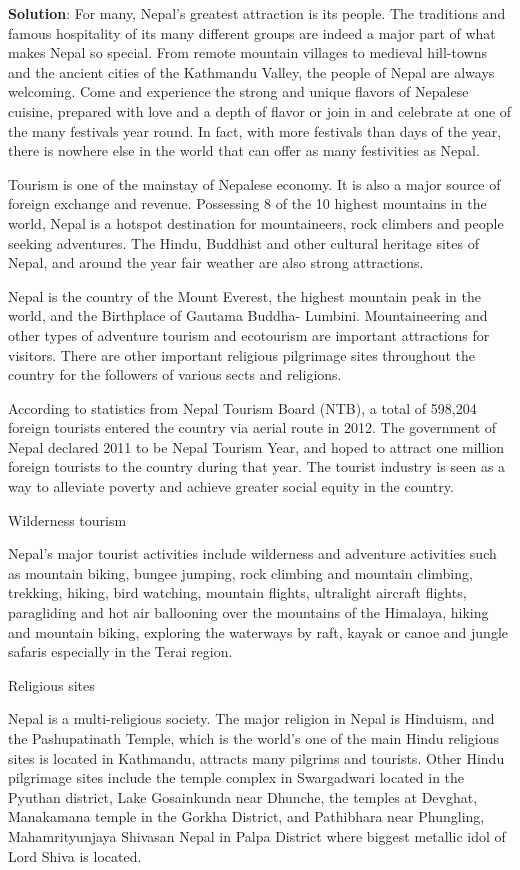 \documentclass[
  openany]{book}
\newenvironment{solution}{ {\bfseries Solution}:}{}
\begin{document}
\begin{questions}
\begin{solution}
For many, Nepal’s greatest attraction is its people. The traditions and famous hospitality of its many different groups are indeed a major part of what makes Nepal so special. From remote mountain villages to medieval hill-towns and the ancient cities of the Kathmandu Valley, the people of Nepal are always welcoming. Come and experience the strong and unique flavors of Nepalese cuisine, prepared with love and a depth of flavor or join in and celebrate at one of the many festivals year round. In fact, with more festivals than days of the year, there is nowhere else in the world that can offer as many festivities as Nepal.

Tourism is one of the mainstay of Nepalese economy. It is also a major source of foreign exchange and revenue. Possessing 8 of the 10 highest mountains in the world, Nepal is a hotspot destination for mountaineers, rock climbers and people seeking adventures. The Hindu, Buddhist and other cultural heritage sites of Nepal, and around the year fair weather are also strong attractions.

Nepal is the country of the Mount Everest, the highest mountain peak in the world, and the Birthplace of Gautama Buddha- Lumbini. Mountaineering and other types of adventure tourism and ecotourism are important attractions for visitors. There are other important religious pilgrimage sites throughout the country for the followers of various sects and religions.

According to statistics from Nepal Tourism Board (NTB), a total of 598,204 foreign tourists entered the country via aerial route in 2012. The government of Nepal declared 2011 to be Nepal Tourism Year, and hoped to attract one million foreign tourists to the country during that year. The tourist industry is seen as a way to alleviate poverty and achieve greater social equity in the country.

Wilderness tourism

Nepal’s major tourist activities include wilderness and adventure activities such as mountain biking, bungee jumping, rock climbing and mountain climbing, trekking, hiking, bird watching, mountain flights, ultralight aircraft flights, paragliding and hot air ballooning over the mountains of the Himalaya, hiking and mountain biking, exploring the waterways by raft, kayak or canoe and jungle safaris especially in the Terai region.

Religious sites

Nepal is a multi-religious society. The major religion in Nepal is Hinduism, and the Pashupatinath Temple, which is the world’s one of the main Hindu religious sites is located in Kathmandu, attracts many pilgrims and tourists. Other Hindu pilgrimage sites include the temple complex in Swargadwari located in the Pyuthan district, Lake Gosainkunda near Dhunche, the temples at Devghat, Manakamana temple in the Gorkha District, and Pathibhara near Phungling, Mahamrityunjaya Shivasan Nepal in Palpa District where biggest metallic idol of Lord Shiva is located.


\end{solution}
\end{questions}
\end{document}
